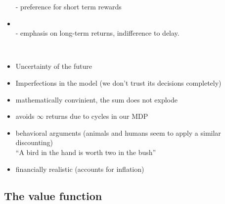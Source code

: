 \begin{frame}
\begin{itemize}
- preference for short term rewards

\item {}\\

- emphasis on long-term returns, indifference to delay.

\end{itemize}

\\

\begin{itemize}
\item Uncertainty of the future
\item Imperfections in the model (we don't trust its decisions completely)
\item mathematically convinient, the sum does not explode
\item avoids $\infty$ returns due to cycles in our MDP
\item behavioral arguments (animals and humans seem to apply a similar discounting)\\
``A bird in the hand is worth two in the bush''
\item financially realistic (accounts for inflation)
\end{itemize}

\citep{sutton1998introduction}

\end{frame} 

\subsection{The value function}



